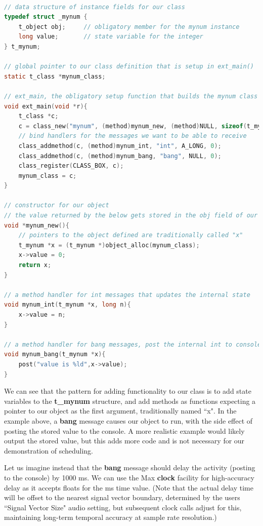 \documentclass[acmsmall]{acmart}
\begin{document}
\begin{lstlisting}[language=C]

// data structure of instance fields for our class
typedef struct _mynum {
    t_object obj;     // obligatory member for the mynum instance 
    long value;       // state variable for the integer
} t_mynum;

// global pointer to our class definition that is setup in ext_main()
static t_class *mynum_class; 

// ext_main, the obligatory setup function that builds the mynum class
void ext_main(void *r){
    t_class *c;
    c = class_new("mynum", (method)mynum_new, (method)NULL, sizeof(t_mynum), 0L, 0);
    // bind handlers for the messages we want to be able to receive
    class_addmethod(c, (method)mynum_int, "int", A_LONG, 0);
    class_addmethod(c, (method)mynum_bang, "bang", NULL, 0);
    class_register(CLASS_BOX, c);
    mynum_class = c;
}

// constructor for our object
// the value returned by the below gets stored in the obj field of our t_mynum struct
void *mynum_new(){
    // pointers to the object defined are traditionally called "x"
    t_mynum *x = (t_mynum *)object_alloc(mynum_class);
    x->value = 0;
    return x;
}

// a method handler for int messages that updates the internal state
void mynum_int(t_mynum *x, long n){
    x->value = n;
}

// a method handler for bang messages, post the internal int to console
void mynum_bang(t_mynum *x){
    post("value is %ld",x->value);
}

\end{lstlisting}


We can see that the pattern for adding functionality to our class is to
add state variables to the \textbf{t\_mynum} structure, and add methods as
functions expecting a pointer to our object as the first argument,
traditionally named ``x". In the example above, a \textbf{bang} message causes our
object to run, with the side effect of posting the stored value to the console. A more
realistic example would likely output the stored value, but this adds more code
and is not necessary for our demonstration of scheduling.

Let us imagine instead that the \textbf{bang} message should delay the activity
(posting to the console) by 1000 ms. We can use the Max \textbf{clock} facility for high-accuracy
delay as it accepts floats for the ms time value. (Note that the actual delay time
will be offset to the nearest signal vector boundary, determined by the
users ``Signal Vector Size" audio setting, but subsequent clock calls 
adjust for this, maintaining long-term temporal accuracy at sample rate resolution.)  
\end{document}
